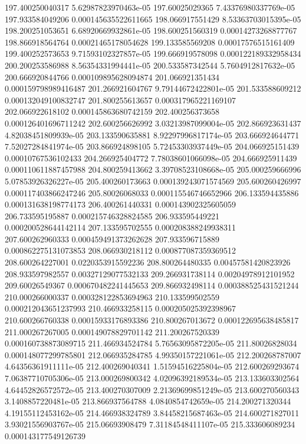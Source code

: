 {197.400250040317 5.62987823970463e-05
197.60025029365 7.43376980337769e-05
197.933584049206 0.000145635522611665
198.066917551429 8.53363703015395e-05
198.200251053651 6.68920669932861e-05
198.600251560319 0.00014273268877767
198.866918564764 0.00021465178054628
199.133585569208 0.00017576515161409
199.400252573653 9.71593102327857e-05
199.666919578098 0.000122189332958434
200.200253586988 8.56354331994441e-05
200.533587342544 5.7604912817632e-05
200.666920844766 0.000109895628094874
201.066921351434 0.000159798989416487
201.266921604767 9.79144672422801e-05
201.533588609212 0.000132049100832747
201.800255613657 0.000317965221169107
202.066922618102 0.000145863680742159
202.400256373658 0.000126401696711242
202.600256626992 3.03213987099004e-05
202.866923631437 4.82038451809939e-05
203.133590635881 8.92297996817174e-05
203.666924644771 7.52027284841974e-05
203.866924898105 5.72453303937449e-05
204.066925151439 0.00010767536102433
204.266925404772 7.78038601066098e-05
204.666925911439 0.000110611887457988
204.800259413662 3.39708523108668e-05
205.000259666996 5.07853926326227e-05
205.400260173663 0.000139243071574569
205.600260426997 0.000117403866247246
205.80026068033 0.000115546746652966
206.133594435886 0.000131638198774173
206.400261440331 0.000143902325605059
206.733595195887 0.000215746328824585
206.933595449221 0.000200528644142114
207.133595702555 0.000208388249938311
207.600262960333 0.000459491373262628
207.933596715889 0.000862275131073853
208.066930218112 0.000877087359369512
208.600264227001 0.0220353915592236
208.800264480335 0.00457581420823926
208.933597982557 0.00327129077532133
209.266931738114 0.00204978912101952
209.60026549367 0.000670482241445653
209.866932498114 0.000388525431521244
210.000266000337 0.000328122853694963
210.133599502559 0.000212043651237993
210.466933258115 0.000205025392398967
210.600266760338 0.00015933176893386
210.800267013672 0.000122695638485817
211.000267267005 0.000149078829701142
211.200267520339 0.000160738873089715
211.466934524784 5.76563095872205e-05
211.80026828034 0.000148077299785801
212.066935284785 4.99350157221061e-05
212.200268787007 4.64356361911111e-05
212.400269040341 1.51594516225804e-05
212.600269293674 7.06387710705306e-05
213.000269800342 4.02096392189534e-05
213.133603302564 4.64452826572572e-05
213.400270307009 2.21369699851249e-05
213.600270560343 3.1408857220481e-05
213.866937564788 4.0840854742659e-05
214.200271320344 4.19155112453162e-05
214.466938324789 3.84458215687463e-05
214.600271827011 3.93021556903767e-05
215.06693908479 7.31184548411107e-05
215.333606089234 0.000143177549126739
}
